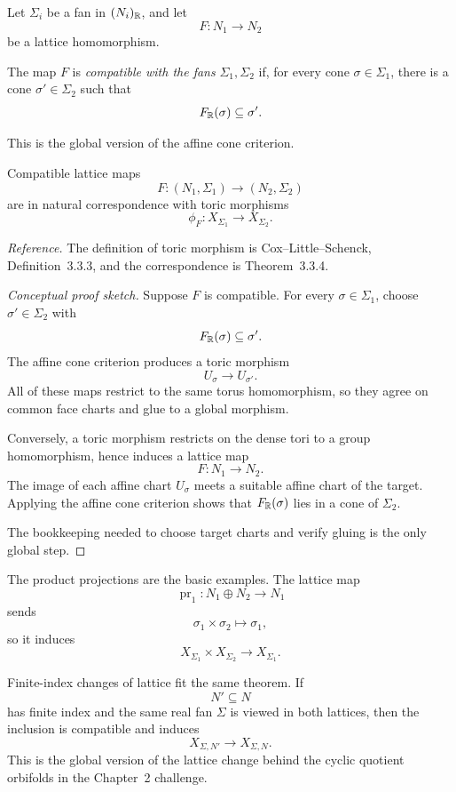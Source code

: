 Let \(\Sigma_i\) be a fan in \((N_i)_{\mathbb{R}}\), and let
\[
F:N_1\longrightarrow N_2
\]
be a lattice homomorphism.

\begin{definition}
The map \(F\) is \emph{compatible with the fans}
\(\Sigma_1,\Sigma_2\) if, for every cone
\(\sigma\in\Sigma_1\), there is a cone
\(\sigma'\in\Sigma_2\) such that
\[
F_{\mathbb{R}}(\sigma)\subseteq\sigma'.
\]
\end{definition}

This is the global version of the affine cone criterion.

\begin{theorem}
\label{thm:toric-morphisms-maps-of-fans}
Compatible lattice maps
\[
F:(N_1,\Sigma_1)\longrightarrow(N_2,\Sigma_2)
\]
are in natural correspondence with toric morphisms
\[
\phi_F:X_{\Sigma_1}\longrightarrow X_{\Sigma_2}.
\]
\end{theorem}

\noindent
\textit{Reference.}
The definition of toric morphism is Cox--Little--Schenck,
Definition~3.3.3, and the correspondence is Theorem~3.3.4.

\begin{proof}[Conceptual proof sketch]
Suppose \(F\) is compatible. For every
\(\sigma\in\Sigma_1\), choose
\(\sigma'\in\Sigma_2\) with
\[
F_{\mathbb{R}}(\sigma)\subseteq\sigma'.
\]
The affine cone criterion produces a toric morphism
\[
U_\sigma\longrightarrow U_{\sigma'}.
\]
All of these maps restrict to the same torus homomorphism, so they
agree on common face charts and glue to a global morphism.

Conversely, a toric morphism restricts on the dense tori to a group
homomorphism, hence induces a lattice map
\[
F:N_1\to N_2.
\]
The image of each affine chart \(U_\sigma\) meets a suitable affine
chart of the target. Applying the affine cone criterion shows that
\(F_{\mathbb{R}}(\sigma)\) lies in a cone of \(\Sigma_2\).

The bookkeeping needed to choose target charts and verify gluing is
the only global step.
\end{proof}

The product projections are the basic examples. The lattice map
\[
\operatorname{pr}_1:
N_1\oplus N_2\longrightarrow N_1
\]
sends
\[
\sigma_1\times\sigma_2
\longmapsto
\sigma_1,
\]
so it induces
\[
X_{\Sigma_1}\times X_{\Sigma_2}
\longrightarrow
X_{\Sigma_1}.
\]

\begin{observation}
Finite-index changes of lattice fit the same theorem. If
\[
N'\subseteq N
\]
has finite index and the same real fan \(\Sigma\) is viewed in both
lattices, then the inclusion is compatible and induces
\[
X_{\Sigma,N'}
\longrightarrow
X_{\Sigma,N}.
\]
This is the global version of the lattice change behind the cyclic
quotient orbifolds in the Chapter~2 challenge.
\end{observation}

